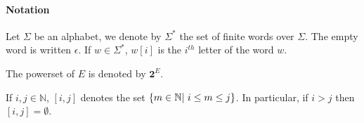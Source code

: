 \paragraph{Notation} Let $\Sigma$ be an alphabet, we denote by $\Sigma^*$
 the set of finite words over $\Sigma$. The empty word is written $\epsilon$. If $w\in \Sigma^*$, $w[i]$ is the $i^{th}$ letter of the word $w$.

The powerset of $E$ is denoted by $\mathbf 2^E$.

If $i, j \in \mathbb{N}$, $[i,j]$ denotes the set $\set{m \in \mathbb{N} |\ i\leq m\leq j}$. In particular, if $ i>j$ then $[i,j]=\emptyset$.  